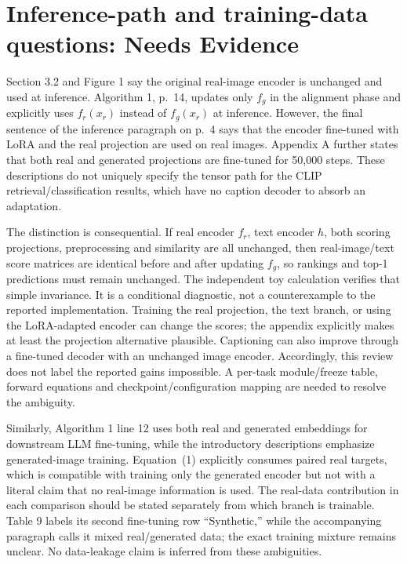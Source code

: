 \documentclass[10pt]{article}
\begin{document}
\section*{Inference-path and training-data questions: Needs Evidence}
Section 3.2 and Figure 1 say the original real-image encoder is unchanged and used at inference. Algorithm 1, p. 14, updates only \(f_g\) in the alignment phase and explicitly uses \(f_r(x_r)\) instead of \(f_g(x_r)\) at inference. However, the final sentence of the inference paragraph on p. 4 says that the encoder fine-tuned with LoRA and the real projection are used on real images. Appendix A further states that both real and generated projections are fine-tuned for 50,000 steps. These descriptions do not uniquely specify the tensor path for the CLIP retrieval/classification results, which have no caption decoder to absorb an adaptation.\par
The distinction is consequential. If real encoder \(f_r\), text encoder \(h\), both scoring projections, preprocessing and similarity are all unchanged, then real-image/text score matrices are identical before and after updating \(f_g\), so rankings and top-1 predictions must remain unchanged. The independent toy calculation verifies that simple invariance. It is a conditional diagnostic, not a counterexample to the reported implementation. Training the real projection, the text branch, or using the LoRA-adapted encoder can change the scores; the appendix explicitly makes at least the projection alternative plausible. Captioning can also improve through a fine-tuned decoder with an unchanged image encoder. Accordingly, this review does not label the reported gains impossible. A per-task module/freeze table, forward equations and checkpoint/configuration mapping are needed to resolve the ambiguity.\par
Similarly, Algorithm 1 line 12 uses both real and generated embeddings for downstream LLM fine-tuning, while the introductory descriptions emphasize generated-image training. Equation (1) explicitly consumes paired real targets, which is compatible with training only the generated encoder but not with a literal claim that no real-image information is used. The real-data contribution in each comparison should be stated separately from which branch is trainable. Table 9 labels its second fine-tuning row “Synthetic,” while the accompanying paragraph calls it mixed real/generated data; the exact training mixture remains unclear. No data-leakage claim is inferred from these ambiguities.\par
\end{document}
